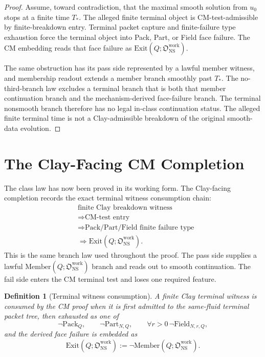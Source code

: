 \documentclass[11pt]{article}
\newtheorem{definition}{Definition}
\newcommand{\NS}{\mathrm{NS}}
\newcommand{\Pack}{\mathrm{Pack}}
\newcommand{\Part}{\mathrm{Part}}
\newcommand{\Field}{\mathrm{Field}}
\newcommand{\Member}{\mathrm{Member}}
\newcommand{\Exit}{\mathrm{Exit}}
\newcommand{\Owork}{\mathfrak O_{\NS}^{\mathrm{work}}}
\begin{document}
\begin{proof}
Assume, toward contradiction, that the maximal smooth solution from \(u_0\) stops at a finite time \(T_*\).
The alleged finite terminal object is CM-test-admissible by finite-breakdown entry.
Terminal packet capture and finite-failure type exhaustion force the terminal object into Pack, Part, or Field face failure.
The CM embedding reads that face failure as \(\Exit(Q;\Owork)\).

The same obstruction has its pass side represented by a lawful member witness, and membership readout extends a member branch smoothly past \(T_*\).
The no-third-branch law excludes a terminal branch that is both that member continuation branch and the mechanism-derived face-failure branch.
The terminal nonsmooth branch therefore has no legal in-class continuation status.
The alleged finite terminal time is not a Clay-admissible breakdown of the original smooth-data evolution.
\end{proof}

\section{The Clay-Facing CM Completion}

The class law has now been proved in its working form.
The Clay-facing completion records the exact terminal witness consumption chain:
\[
\begin{aligned}
&\text{finite Clay breakdown witness}\\
&\Longrightarrow \text{CM-test entry}\\
&\Longrightarrow \text{Pack/Part/Field finite failure type}\\
&\Longrightarrow \Exit(Q;\Owork).
\end{aligned}
\]
This is the same branch law used throughout the proof.
The pass side supplies a lawful \(\Member(Q;\Owork)\) branch and reads out to smooth continuation.
The fail side enters the CM terminal test and loses one required feature.

\begin{definition}[Terminal witness consumption]
A finite Clay terminal witness is consumed by the CM proof when it is first admitted to the same-fluid terminal packet tree, then exhausted as one of
\[
  \neg\Pack_Q,\qquad
  \neg\Part_{N,Q},\qquad
  \forall r>0\,\neg\Field_{N,r,Q},
\]
and the derived face failure is embedded as
\[
  \Exit(Q;\Owork):=\neg\Member(Q;\Owork).
\]
\end{definition}
\end{document}
